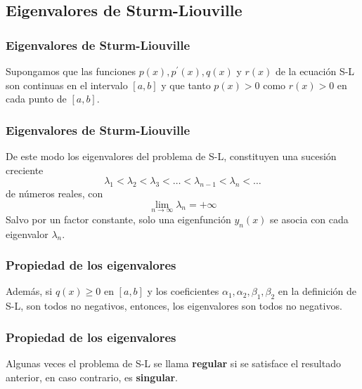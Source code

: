 \subsection{Eigenvalores de Sturm-Liouville}
\begin{frame}
\frametitle{Eigenvalores de Sturm-Liouville}
Supongamos que las funciones $p(x), p^{\prime}(x), q(x)$ y $r(x)$ de la ecuación S-L son continuas en el intervalo $[a,b]$ y que tanto $p(x) > 0$ como $r(x) > 0$ en cada punto de $[a, b]$.
\end{frame}
\begin{frame}
\frametitle{Eigenvalores de Sturm-Liouville}
De este modo los eigenvalores del problema de S-L, constituyen una sucesión creciente
\[ \lambda_{1} < \lambda_{2} < \lambda_{3} < \ldots < \lambda_{n-1} < \lambda_{n} < \ldots\]
de números reales, con
\[ \lim_{n \rightarrow \infty} \lambda_{n} = + \infty\]
Salvo por un factor constante, solo una eigenfunción $y_{n}(x)$ se asocia con cada eigenvalor $\lambda_{n}$.
\end{frame}
\begin{frame}
\frametitle{Propiedad de los eigenvalores}
Además, si $q(x) \geq 0$ en $[a,b]$ y los coeficientes $\alpha_{1},\alpha_{2},\beta_{1},\beta_{2}$ en la definición de S-L, son todos no negativos, entonces, los eigenvalores son todos no negativos.
\end{frame}
\begin{frame}
\frametitle{Propiedad de los eigenvalores}
Algunas veces el problema de S-L se llama \textbf{regular} si se satisface el resultado anterior, en caso contrario, es \textbf{singular}.
\end{frame}
